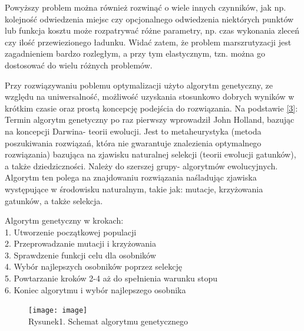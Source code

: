 \documentclass[a4paper, twoside, 12pt, justified]{article}
\begin{document}
	\vspace{5mm} %

	\hspace{5mm}Powyższy problem można również rozwinąć o wiele innych czynników, jak np. kolejność odwiedzenia miejsc czy opcjonalnego odwiedzenia niektórych punktów lub funkcja kosztu może rozpatrywać różne parametry, np. czas wykonania zleceń czy ilość przewiezionego ładunku. Widać zatem, że problem marszrutyzacji jest zagadnieniem bardzo rozległym, a przy tym elastycznym, tzn. można go dostosować do wielu różnych problemów.
	
	\vspace{5mm}
	
	\hspace{5mm}Przy rozwiązywaniu poblemu optymalizacji użyto algorytm genetyczny, ze względu na uniwersalność, możliwość uzyskania stosunkowo dobrych wyników w krótkim czasie oraz prostą koncepcję podejścia do rozwiązania. Na podstawie \hyperlink{ag}{[3]}:\\
	Termin algorytm genetyczny po raz pierwszy wprowadził John Holland, bazując na koncepcji Darwina- teorii ewolucji. Jest to metaheurystyka (metoda poszukiwania rozwiązań, która nie gwarantuje znalezienia optymalnego rozwiązania) bazująca na zjawisku naturalnej selekcji (teorii ewolucji gatunków), a także dziedziczności. Należy do szerszej grupy- algorytmów ewolucyjnych. Algorytm ten polega na znajdowaniu rozwiązania naśladując zjawiska występujące w środowisku naturalnym, takie jak: mutacje, krzyżowania gatunków, a także selekcja. \newpage
	
	Algorytm genetyczny w krokach:\\
	1. Utworzenie początkowej populacji\\
	2. Przeprowadzanie mutacji i krzyżowania\\
	3. Sprawdzenie funkcji celu dla osobników\\
	4. Wybór najlepszych osobników poprzez selekcję\\
	5. Powtarzanie kroków 2-4 aż do spełnienia warunku stopu\\
	6. Koniec algorytmu i wybór najlepszego osobnika
	
	\vspace{10mm}
	
	
	\begin{figure}[h]
	\texttt{[image: image]}
	\centering
	\\
	{Rysunek1. Schemat algorytmu genetycznego} 
	\end{figure}
	
\end{document}

